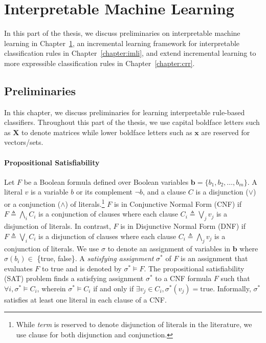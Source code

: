 \part{Interpretable Machine Learning}


In this part of the thesis, we discuss preliminaries on interpretable machine learning in Chapter~\ref{chapter_interpretability_preliminaries}, an incremental learning framework for interpretable classification rules in Chapter~\ref{chapter:imli}, and extend incremental learning to more expressible classification rules in Chapter~\ref{chapter:crr}. 

\chapter{Preliminaries}
\label{chapter_interpretability_preliminaries}

In this chapter, we discuss preliminaries for learning interpretable rule-based classifiers. Throughout this part of the thesis, we use capital  boldface letters such as $\mathbf{X}$ to denote matrices while lower boldface letters such as $\mathbf{x}$ are reserved for vectors/sets. 

\subsection{Propositional Satisfiability}

Let $F$ be a Boolean formula defined over Boolean variables $\mathbf{b} = \{b_1,b_2,\dots ,b_m \}$. A literal $ v $ is a variable $b$ or its complement $\neg b$, and a clause $ C $ is a disjunction ($ \vee $) or a conjunction ($ \wedge $) of literals.\footnote{While \emph{term} is reserved to denote disjunction of literals in the literature, we use clause for both disjunction and conjunction.}  $F$ is in Conjunctive Normal Form (CNF) if $F \triangleq  \bigwedge_i C_i$ is a conjunction of clauses where each clause $C_i \triangleq  \bigvee_j v_j $  is a disjunction of literals. In contrast, $ F $ is in Disjunctive Normal Form (DNF) if $F \triangleq  \bigvee_i C_i$ is a disjunction of clauses where each clause $C_i \triangleq  \bigwedge_j v_j $ is a conjunction of literals. We use $\sigma$ to denote an assignment of variables in  $\mathbf{b}$ where $ \sigma(b_i) \in $ \{true, false\}. A \emph{satisfying assignment} $ \sigma^* $ of $F$ is an assignment  that evaluates $F$  to true and is denoted by $ \sigma^* \models F $. The propositional satisfiability (SAT) problem finds a satisfying assignment $ \sigma^* $ to a CNF formula $ F $  such that $ \forall i, \sigma^* \models C_i $, wherein $ \sigma^*\models C_i $ if and only if $ \exists v_j \in C_i, \sigma^*(v_j) = \text{true} $. Informally, $ \sigma^* $ satisfies at least one literal in each clause of a CNF. 


